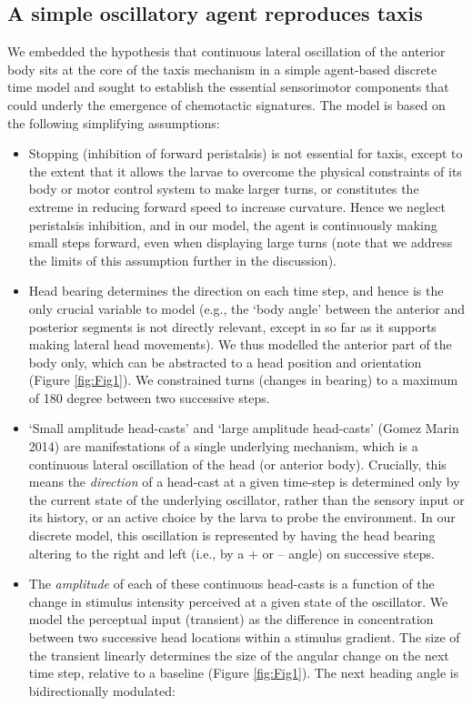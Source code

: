\documentclass[10pt,a4paper]{article}
\begin{document}
\subsection{A simple oscillatory agent reproduces taxis}
We embedded the hypothesis that continuous lateral oscillation of the anterior body sits at the core of the taxis mechanism in a simple agent-based discrete time model and sought to establish the essential sensorimotor components that could underly the emergence of chemotactic signatures. The model is based on the following simplifying assumptions:
\begin{itemize}
\item Stopping (inhibition of forward peristalsis) is not essential for taxis, except to the extent that it allows the larvae to overcome the physical constraints of its body or motor control system to make larger turns, or constitutes the extreme in reducing forward speed to increase curvature. Hence we neglect peristalsis inhibition, and in our model, the agent is continuously making small steps forward, even when displaying large turns (note that we address the limits of this assumption further in the discussion).
\item Head bearing determines the direction on each time step, and hence is the only crucial variable to model (e.g., the ‘body angle’ between the anterior and posterior segments is not directly relevant, except in so far as it supports making lateral head movements). We thus modelled the anterior part of the body only, which can be abstracted to a head position and orientation (Figure \ref{fig:Fig1}). We constrained turns (changes in bearing) to a maximum of 180 degree between two successive steps.
\item ‘Small amplitude head-casts’ and ‘large amplitude head-casts’ (Gomez Marin 2014) are manifestations of a single underlying mechanism, which is a continuous lateral oscillation of the head (or anterior body). Crucially, this means the {\it direction} of a head-cast at a given time-step is determined only by the current state of the underlying oscillator, rather than the sensory input or its history, or an active choice by the larva to probe the environment. In our discrete model, this oscillation is represented by having the head bearing altering to the right and left (i.e., by a + or – angle) on successive steps. 
\item The {\it amplitude} of each of these continuous head-casts is a function of the change in stimulus intensity perceived at a given state of the oscillator. We model the perceptual input (transient) as the difference in concentration between two successive head locations within a stimulus gradient. The size of the transient linearly determines the size of the angular change on the next time step, relative to a baseline (Figure \ref{fig:Fig1}). The next heading angle is bidirectionally modulated:

\end{itemize}
\end{document}
